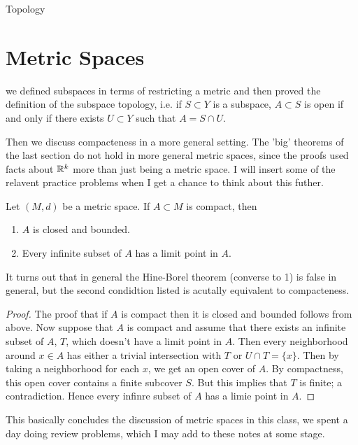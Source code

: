 \begin{chapter}{Topology}
    \section{Metric Spaces}
    
    we defined subspaces in terms of restricting a metric and then proved the definition of the subspace topology, i.e. if $S \subset Y$ is a subspace, $A \subset S$ is open 
    if and only if there exists $U \subset Y$ such that $A = S \cap U$. 


    Then we discuss compacteness in a more general setting. The 'big' theorems of the last section do not hold in more general metric spaces, since the proofs 
    used facts about $\mathbb{R}^k$ more than just being a metric space. I will insert some of the relavent practice problems when I get a chance to think about this futher. 


    \begin{thm}
        Let $(M, d)$ be a metric space. If $A \subset M$ is compact, then 
        \begin{enumerate}
            \item $A$ is closed and bounded.
            \item Every infinite subset of $A$ has a limit point in $A$. 
        \end{enumerate}
    \end{thm}

    It turns out that in general the Hine-Borel theorem (converse to 1) is false in general, but the second condidtion listed is acutally equivalent to compacteness. 



    \begin{proof}
        The proof that if $A$ is compact then it is closed and bounded follows from above. 
        Now suppose that $A$ is compact and assume that there exists an infinite subset of $A$, $T$, which doesn't have a limit point in $A$. 
        Then every neighborhood around $x \in A$ has either a trivial intersection with $T$ or $U \cap T = \{x\}$. Then by taking a neighborhood for each $x$, we get an open cover of $A$. By compactness, 
        this open cover contains a finite subcover $S$. But this implies that $T$ is finite; a contradiction. Hence every infinre subset of $A$ has a limie point in $A$. 
    \end{proof}


    This basically concludes the discussion of metric spaces in this class, we spent a day doing review problems, which I may add to these notes at some stage. 
\end{chapter}
